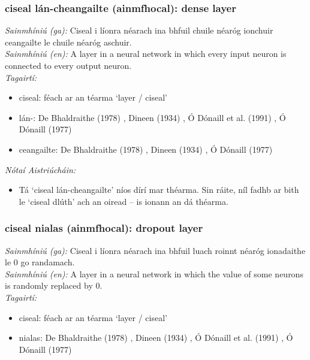 \subsubsection*{ciseal lán-cheangailte (ainmfhocal): dense layer}
 \noindent \textit{Sainmhíniú (ga):} Ciseal i líonra néarach ina bhfuil chuile néaróg ionchuir ceangailte le chuile néaróg aschuir.
\\
 \noindent \textit{Sainmhíniú (en):} A layer in a neural network in which every input neuron is connected to every output neuron.
\\
 \noindent \textit{Tagairtí:}
\begin{itemize}
	\item ciseal: féach ar an téarma `layer / ciseal'
	\item lán-: De Bhaldraithe (1978) \cite{de-bhaldraithe}, Dineen (1934) \cite{dineen}, Ó Dónaill et al. (1991) \cite{focloir-beag}, Ó Dónaill (1977) \cite{odonaill}
	\item ceangailte: De Bhaldraithe (1978) \cite{de-bhaldraithe}, Dineen (1934) \cite{dineen}, Ó Dónaill (1977) \cite{odonaill}
\end{itemize}

 \noindent \textit{Nótaí Aistriúcháin:}
\begin{itemize}
	\item Tá `ciseal lán-cheangailte' níos dírí mar théarma. Sin ráite, níl fadhb ar bith le `ciseal dlúth' ach an oiread -- is ionann an dá théarma.
\end{itemize}


\subsubsection*{ciseal nialas (ainmfhocal): dropout layer}
 \noindent \textit{Sainmhíniú (ga):} Ciseal i líonra néarach ina bhfuil luach roinnt néaróg ionadaithe le 0 go randamach.
\\
 \noindent \textit{Sainmhíniú (en):} A layer in a neural network in which the value of some neurons is randomly replaced by 0.
\\
 \noindent \textit{Tagairtí:}
\begin{itemize}
	\item ciseal: féach ar an téarma `layer / ciseal'
	\item nialas: De Bhaldraithe (1978) \cite{de-bhaldraithe}, Dineen (1934) \cite{dineen}, Ó Dónaill et al. (1991) \cite{focloir-beag}, Ó Dónaill (1977) \cite{odonaill}
\end{itemize}

